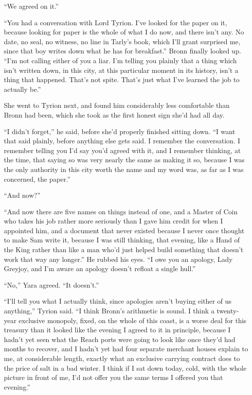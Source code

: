 “We agreed on it.”

“You had a conversation with Lord Tyrion. I’ve looked for the paper on it, because looking for paper is the whole of what I do now, and there isn’t any. No date, no seal, no witness, no line in Tarly’s book, which I’ll grant surprised me, since that boy writes down what he has for breakfast.” Bronn finally looked up. “I’m not calling either of you a liar. I’m telling you plainly that a thing which isn’t written down, in this city, at this particular moment in its history, isn’t a thing that happened. That’s not spite. That’s just what I’ve learned the job to actually be.”

\sceneBreak

She went to Tyrion next, and found him considerably less comfortable than Bronn had been, which she took as the first honest sign she’d had all day.

“I didn’t forget,” he said, before she’d properly finished sitting down. “I want that said plainly, before anything else gets said. I remember the conversation. I remember telling you I’d say you’d agreed with it, and I remember thinking, at the time, that saying so was very nearly the same as making it so, because I was the only authority in this city worth the name and my word was, as far as I was concerned, the paper.”

“And now?”

“And now there are five names on things instead of one, and a Master of Coin who takes his job rather more seriously than I gave him credit for when I appointed him, and a document that never existed because I never once thought to make Sam write it, because I was still thinking, that evening, like a Hand of the King rather than like a man who’d just helped build something that doesn’t work that way any longer.” He rubbed his eyes. “I owe you an apology, Lady Greyjoy, and I’m aware an apology doesn’t refloat a single hull.”

“No,” Yara agreed. “It doesn’t.”

\sceneBreak

“I’ll tell you what I actually think, since apologies aren’t buying either of us anything,” Tyrion said. “I think Bronn’s arithmetic is sound. I think a twenty-year exclusive monopoly, fixed, on the whole of this coast, is a worse deal for this treasury than it looked like the evening I agreed to it in principle, because I hadn’t yet seen what the Reach ports were going to look like once they’d had months to recover, and I hadn’t yet had four separate merchant houses explain to me, at considerable length, exactly what an exclusive carrying contract does to the price of salt in a bad winter. I think if I sat down today, cold, with the whole picture in front of me, I’d not offer you the same terms I offered you that evening.”

